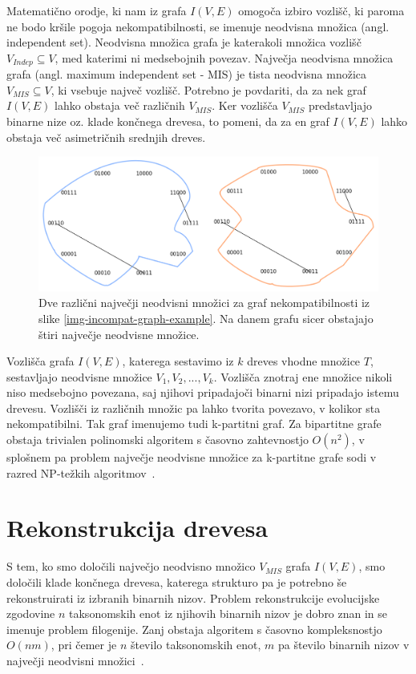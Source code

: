 \documentclass[a4paper, 12pt]{book}
\begin{document}
Matematično orodje, ki nam iz grafa $I(V, E)$ omogoča izbiro vozlišč, ki paroma ne bodo kršile pogoja nekompatibilnosti, se imenuje neodvisna množica (angl. independent set). Neodvisna množica grafa je katerakoli množica vozlišč $V_{Indep} \subseteq V$, med katerimi ni medsebojnih povezav. Največja neodvisna množica grafa (angl. maximum independent set - MIS) je tista neodvisna množica $V_{MIS} \subseteq V$, ki vsebuje največ vozlišč. Potrebno je povdariti, da za nek graf $I(V, E)$ lahko obstaja več različnih $V_{MIS}$. Ker vozlišča $V_{MIS}$ predstavljajo binarne nize oz. klade končnega drevesa, to pomeni, da za en graf $I(V, E)$ lahko obstaja več asimetričnih srednjih dreves.

\begin{figure}
	\begin{center}
		\includegraphics[scale=0.46]{gfx/incompat_graphs_pair.png}
	\end{center}
	\caption{Dve različni največji neodvisni množici za graf nekompatibilnosti iz slike \ref{img-incompat-graph-example}. Na danem grafu sicer obstajajo štiri največje neodvisne množice.}
	\label{img-mis-examples}
\end{figure}

Vozlišča grafa $I(V, E)$, katerega sestavimo iz $k$ dreves vhodne množice $T$, sestavljajo neodvisne množice $V_1, V_2, ..., V_k$. Vozlišča znotraj ene množice nikoli niso medsebojno povezana, saj njihovi pripadajoči binarni nizi pripadajo istemu drevesu. Vozlišči iz različnih množic pa lahko tvorita povezavo, v kolikor sta nekompatibilni. Tak graf imenujemo tudi k-partitni graf. Za bipartitne grafe obstaja trivialen polinomski algoritem s časovno zahtevnostjo $O(n^2)$, v splošnem pa problem največje neodvisne množice za k-partitne grafe sodi v razred NP-težkih algoritmov~\cite{pw}. 

\section{Rekonstrukcija drevesa}
S tem, ko smo določili največjo neodvisno množico $V_{MIS}$ grafa $I(V, E)$, smo določili klade končnega drevesa, katerega strukturo pa je potrebno še rekonstruirati iz izbranih binarnih nizov. Problem rekonstrukcije evolucijske zgodovine $n$ taksonomskih enot iz njihovih binarnih nizov je dobro znan in se imenuje problem filogenije. Zanj obstaja algoritem s časovno kompleksnostjo $O(nm)$, pri čemer je $n$ število taksonomskih enot, $m$ pa število binarnih nizov v največji neodvisni množici~\cite{gd}.
\end{document}
